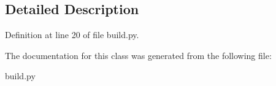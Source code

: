 \subsection{\-Detailed \-Description}


\-Definition at line 20 of file build.\-py.



\-The documentation for this class was generated from the following file\-:\begin{DoxyCompactItemize}
\item 
build.\-py\end{DoxyCompactItemize}
